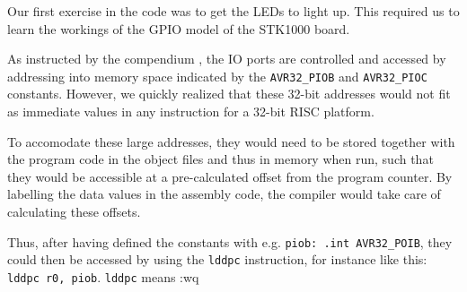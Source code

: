 Our first exercise in the code was to get the LEDs to light up. This
required us to learn the workings of the GPIO model of the STK1000
board.

As instructed by the compendium \cite{comp}, the IO ports are controlled
and accessed by addressing into memory space indicated by the
\texttt{AVR32\_PIOB} and \texttt{AVR32\_PIOC} constants. However, we
quickly realized that these 32-bit addresses would not fit as immediate
values in any instruction for a 32-bit RISC platform.

To accomodate these large addresses, they would need to be stored
together with the program code in the object files and thus in memory
when run, such that they would be accessible at a pre-calculated offset
from the program counter. By labelling the data values in the assembly
code, the compiler would take care of calculating these offsets.

Thus, after having defined the constants with e.g. \texttt{piob: .int
AVR32\_POIB}, they could then be accessed by using the \texttt{lddpc}
instruction, for instance like this: \texttt{lddpc r0, piob}.
\texttt{lddpc} means :wq




